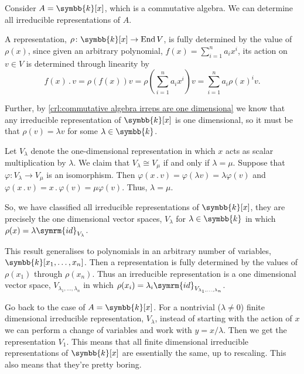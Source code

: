 \documentclass[fleqn]{NotesClass}
\renewcommand{\field}{\symbb{k}}
\newcommand{\id}{\symrm{id}}
\DeclareMathOperator{\End}{End}
\newcommand{\action}{\mathbin{.}}
\newcommand{\isomorphic}{\cong}
\begin{document}
    \begin{exm}{}{}
        Consider \(A = \field[x]\), which is a commutative algebra.
        We can determine all irreducible representations of \(A\).
        
        A representation, \(\rho \colon \field[x] \to \End V\), is fully determined by the value of \(\rho(x)\), since given an arbitrary polynomial, \(f(x) = \sum_{i=1}^{n} a_i x^i\), its action on \(v \in V\) is determined through linearity by
        \begin{equation}
            f(x) \action v = \rho(f(x)) v = \rho\left( \sum_{i=1}^{n} a_i x^i \right) v = \sum_{i=1}^n a_i \rho(x)^i v.
        \end{equation}
        
        Further, by \cref{crl:commutative algebra irreps are one dimensiona} we know that any irreducible representation of \(\field[x]\) is one dimensional, so it must be that \(\rho(v) = \lambda v\) for some \(\lambda \in \field\).
        
        Let \(V_\lambda\) denote the one-dimensional representation in 
        which \(x\) acts as scalar multiplication by \(\lambda\).
        We claim that \(V_\lambda \isomorphic V_{\mu}\) if and only if \(\lambda = \mu\).
        Suppose that \(\varphi \colon V_\lambda \to V_\mu\) is an isomorphism.
        Then \(\varphi(x \action v) = \varphi(\lambda v) = \lambda \varphi(v)\) and \(\varphi(x \action v) = x \action \varphi(v) = \mu \varphi(v)\).
        Thus, \(\lambda = \mu\).
        
        So, we have classified all irreducible representations of \(\field[x]\), they are precisely the one dimensional vector spaces, \(V_\lambda\) for \(\lambda \in \field\) in which \(\rho(x) = \lambda \id_{V_\lambda}\).
        
        This result generalises to polynomials in an arbitrary number of variables, \(\field[x_1, \dotsc, x_n]\).
        Then a representation is fully determined by the values of \(\rho(x_1)\) through \(\rho(x_n)\).
        Thus an irreducible representation is a one dimensional vector space, \(V_{\lambda_1, \dotsc, \lambda_n}\) in which \(\rho(x_i) = \lambda_i \id_{V_{\lambda_1, \dotsc, \lambda_n}}\).
        
        Go back to the case of \(A = \field[x]\).
        For a nontrivial (\(\lambda \ne 0\)) finite dimensional irreducible representation, \(V_\lambda\), instead of starting with the action of \(x\) we can perform a change of variables and work with \(y = x/\lambda\).
        Then we get the representation \(V_1\).
        This means that all finite dimensional irreducible representations of \(\field[x]\) are essentially the same, up to rescaling.
        This also means that they're pretty boring.
        

\end{exm}
\end{document}
